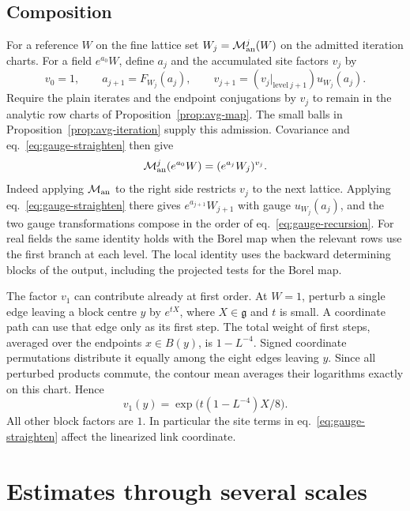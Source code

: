 \documentclass[11pt,letterpaper,reqno]{amsart}
\numberwithin{equation}{section}
\renewcommand{\eqref}[1]{\textup{eq.~\ref{#1}}}
\theoremstyle{definition}
\theoremstyle{remark}
\begin{document}
\subsection{Composition}

For a reference \(W\) on the fine lattice set
\(W_j=\mathcal M_{\rm an}^j(W)\) on the admitted iteration charts.
For a field \(e^{a_0}W\), define \(a_j\) and the accumulated site factors
\(v_j\) by
\begin{equation}\label{eq:gauge-recursion}
 v_0=1,\qquad a_{j+1}=F_{W_j}(a_j),\qquad
 v_{j+1}=(v_j|_{\mathrm{level}\ j+1})u_{W_j}(a_j).
\end{equation}
Require the plain iterates and the endpoint conjugations by \(v_j\)
to remain in the analytic row charts of Proposition~\ref{prop:avg-map}.
The small balls in Proposition~\ref{prop:avg-iteration} supply this
admission. Covariance and \eqref{eq:gauge-straighten} then give
\begin{equation}\label{eq:gauge-factorization}
 \mathcal M_{\rm an}^j(e^{a_0}W)=(e^{a_j}W_j)^{v_j}.
\end{equation}
Indeed applying \(\mathcal M_{\rm an}\) to the right side restricts \(v_j\) to
the next lattice. Applying \eqref{eq:gauge-straighten} there gives
\(e^{a_{j+1}}W_{j+1}\) with gauge \(u_{W_j}(a_j)\), and the two
gauge transformations compose in the order of \eqref{eq:gauge-recursion}.
For real fields the same identity holds with the Borel map when the
relevant rows use the first branch at each level. The local identity
uses the backward determining blocks of the output, including the
projected tests for the Borel map.

The factor \(v_1\) can contribute already at first order. At \(W=1\),
perturb a single edge leaving a block centre \(y\) by \(e^{tX}\),
where \(X\in\mathfrak g\) and \(t\) is small. A coordinate path
can use that edge only as its first step. The total weight of first
steps, averaged over the endpoints \(x\in B(y)\), is \(1-L^{-4}\).
Signed coordinate permutations distribute it equally among the eight
edges leaving \(y\). Since all perturbed products commute, the contour
mean averages their logarithms exactly on this chart. Hence
\[
 v_1(y)=\exp\bigl(t(1-L^{-4})X/8\bigr).
\]
All other block factors are \(1\). In particular the site terms in
\eqref{eq:gauge-straighten} affect the linearized link coordinate.

\section{Estimates through several scales}\label{sec:avg-iteration}
\end{document}
